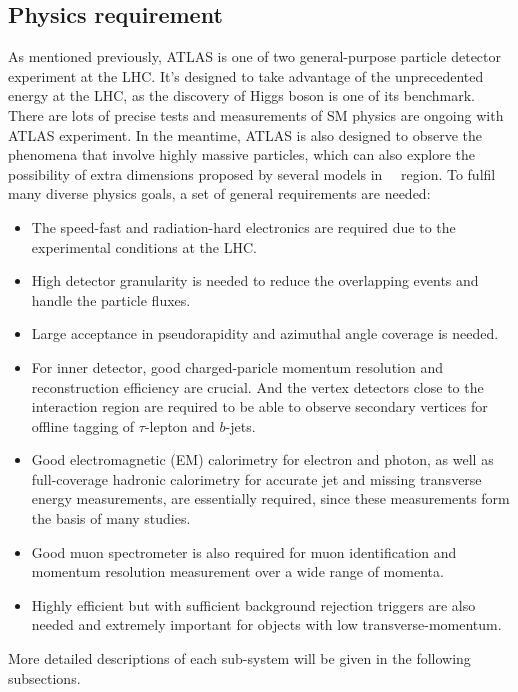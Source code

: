 \subsection{Physics requirement}

As mentioned previously, ATLAS is one of two general-purpose particle detector experiment at the LHC.
It's designed to take advantage of the unprecedented energy at the LHC, as the discovery of Higgs boson is one of its benchmark. 
There are lots of precise tests and measurements of SM physics are ongoing with ATLAS experiment.
In the meantime, ATLAS is also designed to observe the phenomena that involve highly massive particles,
which can also explore the possibility of extra dimensions proposed by several models in~\tev~ region.
To fulfil many diverse physics goals, a set of general requirements are needed:
\begin{itemize}
	\item The speed-fast and radiation-hard electronics are required due to the experimental conditions at the LHC. 
	\item High detector granularity is needed to reduce the overlapping events and handle the particle fluxes.
	\item Large acceptance in pseudorapidity and azimuthal angle coverage is needed.
	\item For inner detector, good charged-paricle momentum resolution and reconstruction efficiency are crucial. And the vertex detectors close to the interaction region are required to be able to observe secondary vertices for offline tagging of $\tau$-lepton and $b$-jets.
	\item Good electromagnetic (EM) calorimetry for electron and photon, as well as full-coverage hadronic calorimetry for accurate jet and missing transverse energy measurements, are essentially required, since these measurements form the basis of many studies.
	\item Good muon spectrometer is also required for muon identification and momentum resolution measurement over a wide range of momenta.
	\item Highly efficient but with sufficient background rejection triggers are also needed and extremely important for objects with low transverse-momentum. 
\end{itemize}

More detailed descriptions of each sub-system will be given in the following subsections.
